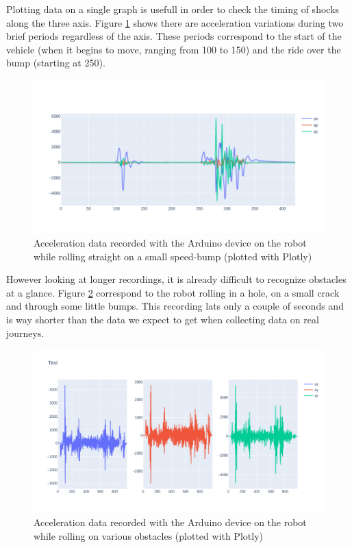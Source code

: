 Plotting data on a single graph is usefull in order to check the timing of shocks along the three axis. Figure \ref{bump_2} shows there are acceleration variations during two brief periods regardless of the axis. These periods correspond to the start of the vehicle (when it begins to move, ranging from 100 to 150) and the ride over the bump (starting at 250).\\

\begin{figure}
    \center
    \includegraphics[scale=.5]{img/DATA1_combined.png}
    \caption{Acceleration data recorded with the Arduino device on the robot while rolling straight on a small speed-bump (plotted with Plotly)}
    \label{bump_2}
\end{figure}

However looking at longer recordings, it is already difficult to recognize obstacles at a glance. Figure \ref{bump_3} correspond to the robot rolling in a hole, on a small crack and through some little bumps. This recording lats only a couple of seconds and is way shorter than the data we expect to get when collecting data on real journeys.\\

\begin{figure}
    \center
    \includegraphics[scale=.5]{img/DATA9.png}
    \caption{Acceleration data recorded with the Arduino device on the robot while rolling on various obstacles (plotted with Plotly)}
    \label{bump_3}
\end{figure}

